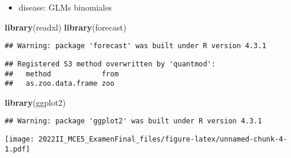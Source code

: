 \documentclass[
]{article}
\newenvironment{Shaded}{\begin{snugshade}}{\end{snugshade}}
\newcommand{\AttributeTok}[1]{\textcolor[rgb]{0.13,0.29,0.53}{#1}}
\newcommand{\CommentTok}[1]{\textcolor[rgb]{0.56,0.35,0.01}{\textit{#1}}}
\newcommand{\DecValTok}[1]{\textcolor[rgb]{0.00,0.00,0.81}{#1}}
\newcommand{\FunctionTok}[1]{\textcolor[rgb]{0.13,0.29,0.53}{\textbf{#1}}}
\newcommand{\NormalTok}[1]{#1}
\newcommand{\OtherTok}[1]{\textcolor[rgb]{0.56,0.35,0.01}{#1}}
\newcommand{\SpecialCharTok}[1]{\textcolor[rgb]{0.81,0.36,0.00}{\textbf{#1}}}
\newcommand{\StringTok}[1]{\textcolor[rgb]{0.31,0.60,0.02}{#1}}
\providecommand{\tightlist}{%
  \setlength{\itemsep}{0pt}\setlength{\parskip}{0pt}}
\begin{document}
\begin{itemize}
\tightlist
\item
  disease: GLMs binomiales
\end{itemize}

\begin{Shaded}
\begin{Highlighting}[]
\FunctionTok{library}\NormalTok{(readxl)}
\FunctionTok{library}\NormalTok{(forecast)}
\end{Highlighting}
\end{Shaded}

\begin{verbatim}
## Warning: package 'forecast' was built under R version 4.3.1
\end{verbatim}

\begin{verbatim}
## Registered S3 method overwritten by 'quantmod':
##   method            from
##   as.zoo.data.frame zoo
\end{verbatim}

\begin{Shaded}
\begin{Highlighting}[]
\FunctionTok{library}\NormalTok{(ggplot2)}
\end{Highlighting}
\end{Shaded}

\begin{verbatim}
## Warning: package 'ggplot2' was built under R version 4.3.1
\end{verbatim}

\begin{Shaded}
\end{Shaded}

\texttt{[image: 2022II\_MCE5\_ExamenFinal\_files/figure-latex/unnamed-chunk-4-1.pdf]}
\end{document}
